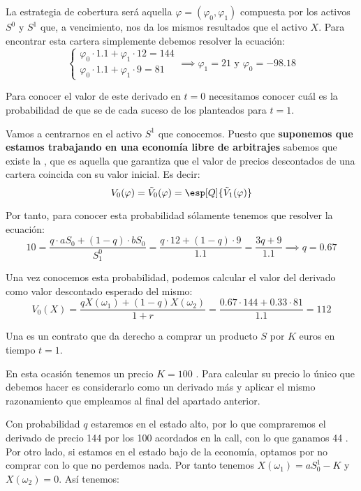 \begin{problem}[2]
La estrategia de cobertura será aquella $\varphi=(\varphi_0,\varphi_1)$ compuesta por los activos $S^0$ y $S^1$ que, a vencimiento, nos da los mismos resultados que el activo $X$. Para encontrar esta cartera simplemente debemos resolver la ecuación:
\[\left\{ \begin{array}{l}
\varphi_0\cdot 1.1 + \varphi_1\cdot 12 = 144 \\
\varphi_0\cdot 1.1 + \varphi_1\cdot 9 = 81
\end{array}\right. \implies \varphi_1 = 21 \text{ y } \varphi_0 = -98.18\]

\spart

Para conocer el valor de este derivado en $t=0$ necesitamos conocer cuál es la probabilidad de que se de cada suceso de los planteados para $t=1$.

Vamos a centrarnos en el activo $S^1$ que conocemos. Puesto que \textbf{suponemos que estamos trabajando en una economía libre de arbitrajes} sabemos que existe la , que es aquella que garantiza que el valor de precios descontados de una cartera coincida con su valor inicial. Es decir:
\[V_0(\varphi) = \tilde{V}_0(\varphi) = \esp[Q]{\tilde{V}_1(\varphi)}\]

Por tanto, para conocer esta probabilidad sólamente tenemos que resolver la ecuación:
\[10 =  \frac{q\cdot aS_0 + (1-q)\cdot bS_0}{S_1^0} =  \frac{q\cdot 12 + (1-q)\cdot 9}{1.1} = \frac{3q + 9}{1.1} \implies q=0.67\]

Una vez conocemos esta probabilidad, podemos calcular el valor del derivado como valor descontado esperado del mismo:
\[V_0(X) = \frac{qX(ω_1) + (1-q)X(ω_2)}{1+r} = \frac{0.67\cdot 144 + 0.33\cdot 81}{1.1} = 112\]

\spart

Una  es un contrato que da derecho a comprar un producto $S$ por $K$ euros en tiempo $t=1$.

En esta ocasión tenemos un precio $K=100$ \texteuro. Para calcular su precio lo único que debemos hacer es considerarlo como un derivado más y aplicar el mismo razonamiento que empleamos al final del apartado anterior.

Con probabilidad $q$ estaremos en el estado alto, por lo que compraremos el derivado de precio 144 \texteuro por los 100 \texteuro acordados en la call, con lo que ganamos 44 \texteuro. Por otro lado, si estamos en el estado bajo de la economía, optamos por no comprar con lo que no perdemos nada. Por tanto tenemos $X(ω_1)=aS^1_0-K$ y $X(ω_2)=0$. Así tenemos:


\end{problem}
